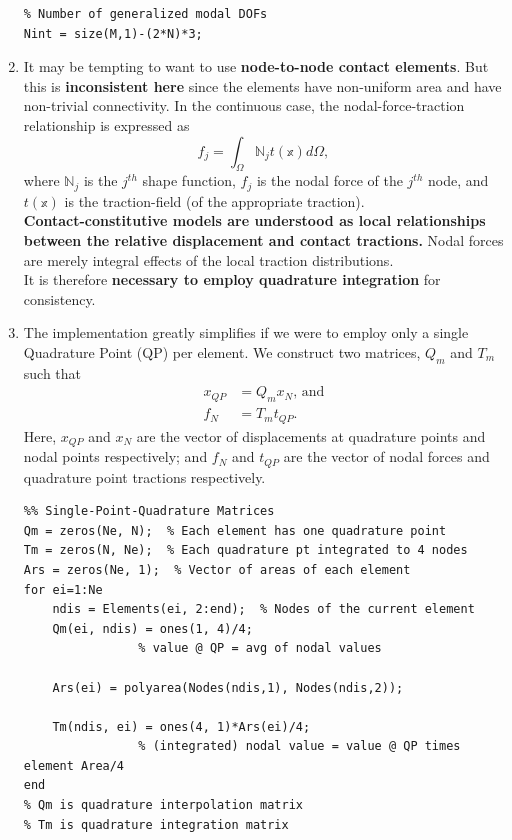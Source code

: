 \documentclass[11pt]{article}
\begin{document}
\begin{enumerate}
\begin{verbatim}
% Number of generalized modal DOFs
Nint = size(M,1)-(2*N)*3;
\end{verbatim}
\item It may be tempting to want to use \textbf{node-to-node contact elements}.
But this is \textbf{inconsistent here} since the elements have non-uniform area and have non-trivial connectivity.
In the continuous case, the nodal-force-traction relationship is expressed as
$$ f_j = \int_\Omega \mathbb{N}_j t(\mathbb{x}) d\Omega, $$
where \(\mathbb{N}_j\) is the \(j^{th}\) shape function, \(f_j\) is the nodal force of the \(j^{th}\) node, and \(t(\mathbb{x})\) is the traction-field (of the appropriate traction).\\[0pt]
\textbf{Contact-constitutive models are understood as local relationships between the relative displacement and contact tractions.}
Nodal forces are merely integral effects of the local traction distributions.\\[0pt]
It is therefore \textbf{necessary to employ quadrature integration} for consistency.
\item The implementation greatly simplifies if we were to employ only a single Quadrature Point (QP) per element.
We construct two matrices, \(Q_m\) and \(T_m\) such that
\begin{align*}
x_{QP} &= Q_{m} x_N \text{, and}\\
f_N &= T_{m} t_{QP}.
\end{align*}
Here, \(x_{QP}\) and \(x_N\) are the vector of displacements at quadrature points and nodal points respectively; and
\(f_N\) and \(t_{QP}\) are the vector of nodal forces and quadrature point tractions respectively.
\begin{verbatim}
%% Single-Point-Quadrature Matrices
Qm = zeros(Ne, N);  % Each element has one quadrature point
Tm = zeros(N, Ne);  % Each quadrature pt integrated to 4 nodes
Ars = zeros(Ne, 1);  % Vector of areas of each element
for ei=1:Ne
    ndis = Elements(ei, 2:end);  % Nodes of the current element
    Qm(ei, ndis) = ones(1, 4)/4;
                % value @ QP = avg of nodal values

    Ars(ei) = polyarea(Nodes(ndis,1), Nodes(ndis,2));

    Tm(ndis, ei) = ones(4, 1)*Ars(ei)/4;
                % (integrated) nodal value = value @ QP times element Area/4
end
% Qm is quadrature interpolation matrix
% Tm is quadrature integration matrix


\end{verbatim}
\end{enumerate}
\end{document}
